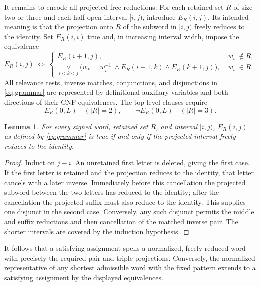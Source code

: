 \documentclass[11pt]{article}
\newtheorem{lemma}[theorem]{Lemma}
\begin{document}
It remains to encode all projected free reductions.  For each retained set
\(R\) of size two or three and each half-open interval \(\mathopen{[}i,j)\), introduce
\(E_R(i,j)\).  Its intended meaning is that the projection onto \(R\) of the
subword in \(\mathopen{[}i,j)\) freely reduces to the identity.  Set \(E_R(i,i)\) true
and, in increasing interval width, impose the equivalence
\begin{equation}\label{eq:grammar}
E_R(i,j)\ \Longleftrightarrow\
\begin{cases}
E_R(i+1,j),& |w_i|\notin R,\\[2mm]
\displaystyle\mathop{\vee}\limits_{i<k<j}
 \bigl(w_k=w_i^{-1}\ \wedge E_R(i+1,k)\wedge E_R(k+1,j)\bigr),
 & |w_i|\in R.
\end{cases}
\end{equation}
All relevance tests, inverse matches, conjunctions, and disjunctions in
\eqref{eq:grammar} are represented by definitional auxiliary variables and
both directions of their CNF equivalences.  The top-level clauses require
\[
 E_R(0,L)\quad (|R|=2),
 \qquad
 \lnot E_R(0,L)\quad (|R|=3).
\]

\begin{lemma}\label{lem:grammar}
For every signed word, retained set \(R\), and interval \(\mathopen{[}i,j)\),
\(E_R(i,j)\) as defined by \eqref{eq:grammar} is true if and only if the
projected interval freely reduces to the identity.
\end{lemma}

\begin{proof}
Induct on \(j-i\).  An unretained first letter is deleted, giving the first
case.  If the first letter is retained and the projection reduces to the
identity, that letter cancels with a later inverse.  Immediately before this
cancellation the projected subword between the two letters has reduced to the
identity; after the cancellation the projected suffix must also reduce to the
identity.  This supplies one disjunct in the second case.  Conversely, any
such disjunct permits the middle and suffix reductions and then cancellation
of the matched inverse pair.  The shorter intervals are covered by the
induction hypothesis.
\end{proof}

It follows that a satisfying assignment spells a normalized, freely reduced
word with precisely the required pair and triple projections.  Conversely,
the normalized representative of any shortest admissible word with the fixed
pattern extends to a satisfying assignment by the displayed equivalences.
\end{document}
